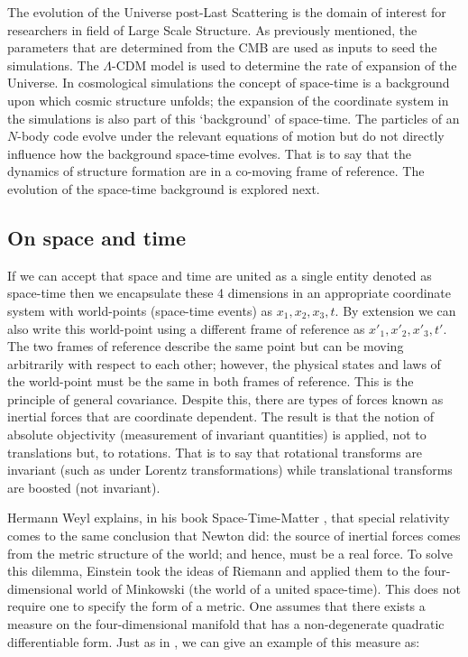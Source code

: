 The evolution of the Universe post-Last Scattering is the domain of interest for researchers in field of Large Scale Structure. As previously mentioned, the parameters that are determined from the CMB are used as inputs to seed the simulations. The $\Lambda$-CDM model is used to determine the rate of expansion of the Universe. In cosmological simulations the concept of space-time is a background upon which cosmic structure unfolds; the expansion of the coordinate system in the simulations is also part of this `background' of space-time. The particles of an $N$-body code evolve under the relevant equations of motion but do not directly influence how the background space-time evolves. That is to say that the dynamics of structure formation are in a co-moving frame of reference. The evolution of the space-time background is explored next.

\subsection{On space and time}
\label{on_spacetime}
If we can accept that space and time are united as a single entity denoted as space-time then we encapsulate these 4 dimensions in an appropriate coordinate system with world-points (space-time events) as $x_1, x_2, x_3, t$. By extension we can also write this world-point using a different frame of reference as $x'_1, x'_2, x'_3, t'$. The two frames of reference describe the same point but can be moving arbitrarily with respect to each other; however, the physical states and laws of the world-point must be the same in both frames of reference. This is the principle of general covariance. Despite this, there are types of forces known as inertial forces that are coordinate dependent. The result is that the notion of absolute objectivity (measurement of invariant quantities) is applied, not to translations but, to rotations. That is to say that rotational transforms are invariant (such as under Lorentz transformations) while translational transforms are boosted (not invariant).

Hermann Weyl explains, in his book Space-Time-Matter \citep{bib_weyl}, that special relativity comes to the same conclusion that Newton did: the source of inertial forces comes from the metric structure of the world; and hence, must be a real force. To solve this dilemma, Einstein took the ideas of Riemann and applied them to the four-dimensional world of Minkowski (the world of a united space-time). This does not require one to specify the form of a metric. One assumes that there exists a measure on the four-dimensional manifold that has a non-degenerate quadratic differentiable form. Just as in \citep{bib_weyl}, we can give an example of this measure as:

